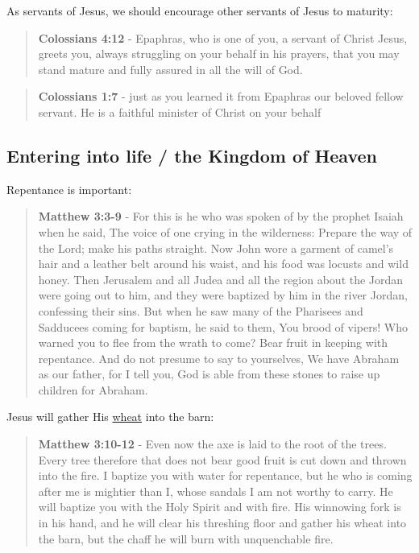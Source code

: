 \documentclass[11pt]{article}
\begin{document}
As servants of Jesus, we should encourage other servants of Jesus to maturity:

\begin{quote}
\textbf{Colossians 4:12} - Epaphras, who is one of you, a servant of Christ Jesus, greets you, always struggling on your behalf in his prayers, that you may stand mature and fully assured in all the will of God.
\end{quote}

\begin{quote}
\textbf{Colossians 1:7} - just as you learned it from Epaphras our beloved fellow servant. He is a faithful minister of Christ on your behalf
\end{quote}

\subsection{Entering into life / the Kingdom of Heaven}
\label{sec:org89775da}
Repentance is important:

\begin{quote}
\textbf{Matthew 3:3-9} - For this is he who was spoken of by the prophet Isaiah when he said, The voice of one crying in the wilderness: Prepare the way of the Lord; make his paths straight. Now John wore a garment of camel's hair and a leather belt around his waist, and his food was locusts and wild honey. Then Jerusalem and all Judea and all the region about the Jordan were going out to him, and they were baptized by him in the river Jordan, confessing their sins. But when he saw many of the Pharisees and Sadducees coming for baptism, he said to them, You brood of vipers! Who warned you to flee from the wrath to come? Bear fruit in keeping with repentance. And do not presume to say to yourselves, We have Abraham as our father, for I tell you, God is able from these stones to raise up children for Abraham.
\end{quote}

Jesus will gather His \uline{wheat} into the barn:

\begin{quote}
\textbf{Matthew 3:10-12} - Even now the axe is laid to the root of the trees. Every tree therefore that does not bear good fruit is cut down and thrown into the fire. I baptize you with water for repentance, but he who is coming after me is mightier than I, whose sandals I am not worthy to carry. He will baptize you with the Holy Spirit and with fire. His winnowing fork is in his hand, and he will clear his threshing floor and gather his wheat into the barn, but the chaff he will burn with unquenchable fire.
\end{quote}
\end{document}
